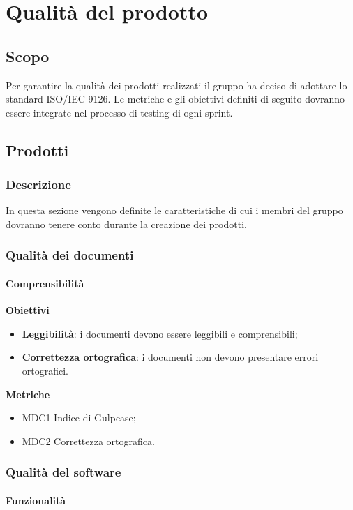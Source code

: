 \section{Qualità del prodotto}
\subsection{Scopo}
Per garantire la qualità dei prodotti realizzati il gruppo ha deciso di adottare lo standard ISO/IEC 9126.
Le metriche e gli obiettivi definiti di seguito dovranno essere integrate nel processo di testing di ogni sprint.
\subsection{Prodotti}
\subsubsection{Descrizione}
In questa sezione vengono definite le caratteristiche di cui i membri del gruppo dovranno tenere conto durante la creazione dei prodotti.
\subsubsection{Qualità dei documenti}

\paragraph{Comprensibilità}

\textbf{Obiettivi}
\begin{itemize}
\item \textbf{Leggibilità}: i documenti devono essere leggibili e comprensibili;
\item \textbf{Correttezza ortografica}: i documenti non devono presentare errori ortografici.
\end{itemize}

\textbf{Metriche}
\begin{itemize}
\item MDC1 Indice di Gulpease;
\item MDC2 Correttezza ortografica.
\end{itemize}

\subsubsection{Qualità del software}

\paragraph{Funzionalità}

